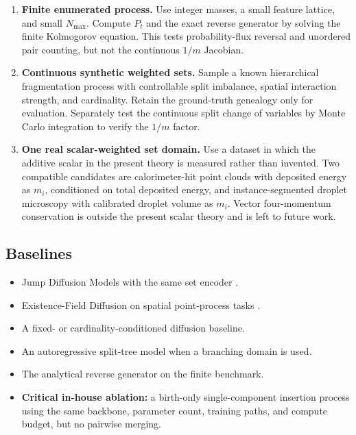 \documentclass[10pt]{article}
\theoremstyle{definition}
\theoremstyle{remark}
\begin{document}
\begin{enumerate}
  \item \textbf{Finite enumerated process.}  Use integer masses, a small
  feature lattice, and small $N_{\max}$.  Compute $P_t$ and the exact reverse
  generator by solving the finite Kolmogorov equation.  This tests probability-flux reversal
  and unordered pair counting, but not the continuous $1/m$ Jacobian.
  \item \textbf{Continuous synthetic weighted sets.}  Sample a known
  hierarchical fragmentation process with controllable split imbalance,
  spatial interaction strength, and cardinality.  Retain the ground-truth
  genealogy only for evaluation.  Separately test the continuous split
  change of variables by Monte Carlo integration to verify the $1/m$ factor.
  \item \textbf{One real scalar-weighted set domain.}  Use a dataset in
  which the additive scalar in the present theory is measured rather than
  invented.  Two compatible candidates are calorimeter-hit point clouds
  with deposited energy as $m_i$, conditioned on total deposited energy,
  and instance-segmented droplet microscopy with calibrated droplet volume
  as $m_i$.
  Vector four-momentum conservation is outside the present scalar theory and
  is left to future work.
\end{enumerate}

\subsection{Baselines}

\begin{itemize}
  \item Jump Diffusion Models with the same set encoder \cite{campbell2023transdimensional}.
  \item Existence-Field Diffusion on spatial point-process tasks \cite{pan2026existence}.
  \item A fixed- or cardinality-conditioned diffusion baseline.
  \item An autoregressive split-tree model when a branching domain is used.
  \item The analytical reverse generator on the finite benchmark.
  \item \textbf{Critical in-house ablation:} a birth-only
  single-component insertion process using the same backbone, parameter
  count, training paths, and compute budget, but no pairwise merging.
\end{itemize}
\end{document}
